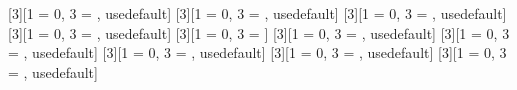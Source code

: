 [3][1 = 0, 3 = { }, usedefault]{
}
[3][1 = 0, 3 = { }, usedefault]{
}
[3][1 = 0, 3 = { }, usedefault]{
}
[3][1 = 0, 3 = { }, usedefault]{
}
\newcommand{\marg}[2][0]{
	\ifthenelse{ \equal{#1}{0} }{\arg\left( #2 \right)}{\arg{#2}}
}
[3][1 = 0, 3 = { }]{
}
[3][1 = 0, 3 = { }, usedefault]{
}
\newcommand{\mdim}[2][0]{
	\ifthenelse{ \equal{#1}{0} }{\dim\left( #2 \right)}{\dim{#2}}
}
\newcommand{\mexp}[2][0]{
	\ifthenelse{ \equal{#1}{0} }{\exp\left( #2 \right)}{\exp{#2}}
}
\DeclareMathOperator*{\mcd}{mcd}
[3][1 = 0, 3 = { }, usedefault]{
	\ifthenelse{ \equal{#1}{0} }{\mcd_{#3}\left( #2 \right)}{\mcd_{#3}{#2}}
}
\newcommand{\mln}[2][0]{
	\ifthenelse{ \equal{#1}{0} }{\ln\left( #2 \right)}{\ln{#2}}
}
[3][1 = 0, 3 = { }, usedefault]{
}
[3][1 = 0, 3 = { }, usedefault]{
}
[3][1 = 0, 3 = { }, usedefault]{
}
\newcommand{\mpow}[2][0]{
	\ifthenelse{ \equal{#1}{0} }{\mathfrak{P}\left( #2 \right)}{\mathfrak{P}{#2}}
}
\newcommand{\mnu}[2][0]{
	\ifthenelse{ \equal{#1}{0} }{\nu\left( #2 \right)}{\nu{#2}}
}
\newcommand{\mrho}[2][0]{
	\ifthenelse{ \equal{#1}{0} }{\rho\left( #2 \right)}{\rho{#2}}
}
\newcommand{\mnuc}[2][0]{
	\ifthenelse{ \equal{#1}{0} }{\operatorname{N}\left( #2 \right)}{\operatorname{N}{#2}}
}
\newcommand{\mgen}[2][0]{
	\ifthenelse{ \equal{#1}{0} }{\operatorname{gen}\left( #2 \right)}{\operatorname{gen}{#2}}
}
\newcommand{\mtr}[2][0]{
	\ifthenelse{ \equal{#1}{0} }{\operatorname{tr}\left( #2 \right)}{\operatorname{tr}{#2}}
}
\newcommand{\mdom}[2][0]{
	\ifthenelse{ \equal{#1}{0} }{\operatorname{Dom}\left( #2 \right)}{\operatorname{Dom}{#2}}
}
